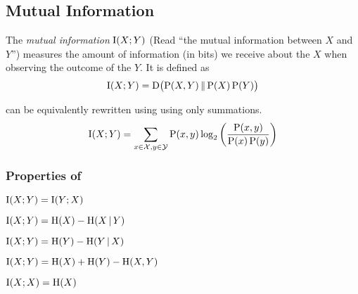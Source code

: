 \subsection{Mutual Information}\label{subsec:Mutual_Information}
\begin{definition}\label{def:Mutual_Information}
  The \emph{mutual information} $\operatorname{\operatorname{I}}(X;Y)$ (Read ``the mutual information between $X$ and $Y$'') measures the amount of information (in bits) we receive about the  $X$ when observing the outcome of the  $Y$.
  It is defined as
  \begin{equation}\label{eq:Mutual_Information}
    \operatorname{\operatorname{I}}(X;Y) = \operatorname{\operatorname{D}} \bigl( \operatorname{\operatorname{P}}(X,Y) \operatorname{\Vert} \operatorname{\operatorname{P}}(X) \operatorname{\operatorname{P}}(Y) \bigr)
  \end{equation}

   can be equivalently rewritten using using only summations.
  \begin{equation}\label{eq:Mutual_Information-Summations}
    \operatorname{\operatorname{I}}(X;Y) = \sum\limits_{x \in \mathcal{X}, y \in \mathcal{Y}} \operatorname{\operatorname{P}}(x,y) \log_{2} \left( \frac{\operatorname{\operatorname{P}}(x,y)}{\operatorname{\operatorname{P}}(x) \operatorname{\operatorname{P}}(y)} \right)
  \end{equation}
\end{definition}

\subsubsection{Properties of }\label{subsubsec:Mutual_Information_Properties}
\begin{propertylist}
\item $\operatorname{\operatorname{I}}(X;Y) = \operatorname{\operatorname{I}}(Y;X)$\label{prop:Mutual_Information_Properties-Mutual}
\item $\operatorname{\operatorname{I}}(X;Y) = \operatorname{\operatorname{H}}(X) - \operatorname{\operatorname{H}}(X \operatorname{\vert} Y)$\label{prop:Mutual_Information_Properties-XY_Entropy}
\item $\operatorname{\operatorname{I}}(X;Y) = \operatorname{\operatorname{H}}(Y) - \operatorname{\operatorname{H}}(Y \operatorname{\vert} X)$\label{prop:Mutual_Information_Properties-YX_Entropy}
\item $\operatorname{\operatorname{I}}(X;Y) = \operatorname{\operatorname{H}}(X) + \operatorname{\operatorname{H}}(Y) - \operatorname{\operatorname{H}}(X,Y)$\label{prop:Mutual_Information_Properties-X_and_Y_Entropy}
\item $\operatorname{\operatorname{I}}(X;X) = \operatorname{\operatorname{H}}(X)$\label{prop:Mutual_Information_Properties-Self_Observance}
\end{propertylist}

